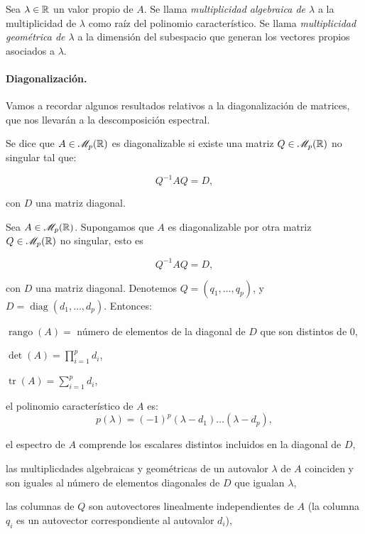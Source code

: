 \begin{ndef}
  Sea $\lambda \in \mathbb{R}$ un valor propio de $A$. Se llama \emph{multiplicidad algebraica de $\lambda$} a la multiplicidad
  de $\lambda$ como raíz del polinomio característico. Se llama \emph{multiplicidad geométrica de $\lambda$} a la dimensión
  del subespacio que generan los vectores propios asociados a $\lambda$.
\end{ndef}

\paragraph{Diagonalización.}\hfill

Vamos a recordar algunos resultados relativos a la diagonalización de matrices, que nos llevarán a la descomposición espectral.

    \begin{ndef}
      Se dice que $A\in \mathscr{M}_{p}(\mathbb{R})$ es diagonalizable si existe una matriz $Q\in \mathscr{M}_{p}(\mathbb{R})$ no singular tal que:
      
      \[
      Q^{-1}AQ = D,
      \]
      
      con $D$ una matriz diagonal.
    \end{ndef}

    \begin{nth}
      Sea $A\in \mathscr{M}_{p}(\mathbb{R})$. Supongamos que $A$ es diagonalizable por otra matriz $Q\in \mathscr{M}_{p}(\mathbb{R})$ no singular, esto es
      
      \[
      Q^{-1}AQ = D,
      \]
      
      con $D$ una matriz diagonal. Denotemos $Q = (q_1,\dots,q_p)$, y $D= \operatorname{diag}(d_1,\dots,d_p)$. Entonces:
      
      \begin{nlist}
      \item $\operatorname{rango}(A) = $ número de elementos de la diagonal de $D$ que son distintos de 0,
      \item $\det(A) = \prod_{i = 1}^p d_i$,
      \item $\operatorname{tr}(A) = \sum_{i = 1}^p d_i$,
      \item el polinomio característico de $A$ es:
        \[
        p(\lambda) = (-1)^p (\lambda-d_1)\dots(\lambda-d_p),
        \]
      \item el espectro de $A$ comprende los escalares distintos incluidos en la diagonal de $D$,
      \item las multiplicdades algebraicas y geométricas de un autovalor $\lambda$ de $A$ coinciden y son iguales al número de elementos diagonales de $D$ que igualan $\lambda$,
      \item las columnas de $Q$ son autovectores linealmente independientes de $A$ (la columna $q_i$ es un autovector correspondiente al autovalor $d_i$),
    \end{nlist}
\end{nth}

